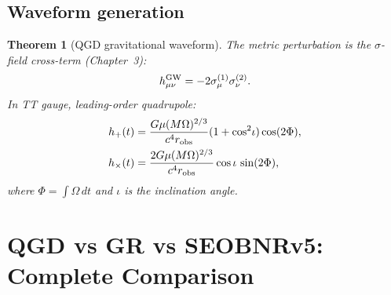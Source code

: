 \documentclass[11pt,a4paper]{article}
\theoremstyle{plain}
\newtheorem{theorem}{Theorem}[section]
\theoremstyle{definition}
\theoremstyle{remark}
\begin{document}
\subsection{Waveform generation}

\begin{theorem}[QGD gravitational waveform]\label{thm:waveform}
The metric perturbation is the $\sigma$-field cross-term (Chapter~3):
\begin{equation}
  h_{\mu\nu}^{\rm GW} = -2\sigma_\mu^{(1)}\sigma_\nu^{(2)}.
  \label{eq:h_sigma}
\end{equation}
In TT gauge, leading-order quadrupole:
\begin{align}
  h_+(t) &= \frac{G\mu(M\Omega)^{2/3}}{c^4 r_{\rm obs}}(1+\cos^2\!\iota)
    \cos(2\Phi),
  \label{eq:hplus}\\
  h_\times(t) &= \frac{2G\mu(M\Omega)^{2/3}}{c^4 r_{\rm obs}}\cos\iota\,\sin(2\Phi),
  \label{eq:hcross}
\end{align}
where $\Phi = \int\Omega\,dt$ and $\iota$ is the inclination angle.
\end{theorem}

\section{QGD vs GR vs SEOBNRv5: Complete Comparison}
\label{sec:comparison}
\end{document}
